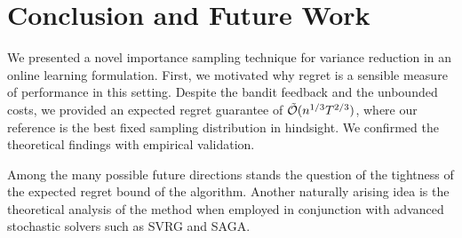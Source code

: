\section{Conclusion and Future Work}

We presented a novel importance sampling technique for variance reduction in an online learning formulation. First, we motivated why regret is a sensible measure of performance in this setting. Despite the bandit feedback and the unbounded costs, we provided an expected regret guarantee of $\tilde{\mathcal{O}}(n^{1/3}T^{2/3})$, where our reference is the best fixed sampling distribution in hindsight. We confirmed the theoretical findings with empirical validation.

Among the many possible future directions stands the question of the tightness of  the expected regret bound of the algorithm. Another naturally arising idea is the theoretical analysis of the method when employed in conjunction with advanced stochastic solvers such as SVRG and SAGA.